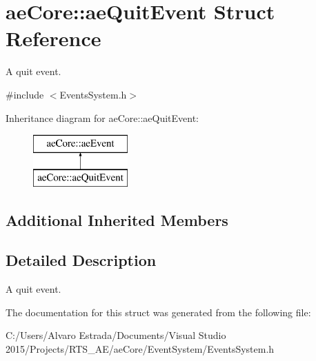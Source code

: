 \hypertarget{structae_core_1_1ae_quit_event}{}\section{ae\+Core\+:\+:ae\+Quit\+Event Struct Reference}
\label{structae_core_1_1ae_quit_event}


A quit event.  




{\ttfamily \#include $<$Events\+System.\+h$>$}

Inheritance diagram for ae\+Core\+:\+:ae\+Quit\+Event\+:\begin{figure}[H]
\begin{center}
\leavevmode
\includegraphics[height=2.000000cm]{structae_core_1_1ae_quit_event}
\end{center}
\end{figure}
\subsection*{Additional Inherited Members}


\subsection{Detailed Description}
A quit event. 

The documentation for this struct was generated from the following file\+:\begin{DoxyCompactItemize}
\item 
C\+:/\+Users/\+Alvaro Estrada/\+Documents/\+Visual Studio 2015/\+Projects/\+R\+T\+S\+\_\+\+A\+E/ae\+Core/\+Event\+System/Events\+System.\+h\end{DoxyCompactItemize}
